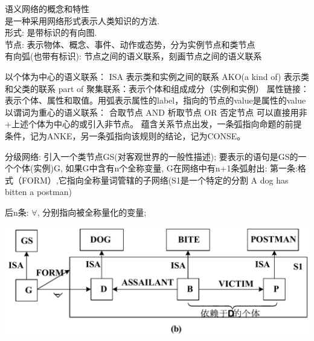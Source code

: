 \documentclass[twocolumn,zihao=5,linespread=1,heading=false,autoindent=0pt]{ctexart}
\theoremstyle{exampstyle} \newtheorem{definition}{定义}[section]
\theoremstyle{exampstyle} \newtheorem{example}{例}[section]
\theoremstyle{exampstyle} \newtheorem{theorem}{定理}[section]
\theoremstyle{exampstyle} \newtheorem{lemma}{引理}[section]
\theoremstyle{exampstyle} \newtheorem{myproof}{证明}[section]
\begin{document}
语义网络的概念和特性\\
是一种采用网络形式表示人类知识的方法.\\
形式: 是带标识的有向图.\\
  节点: 表示物体、概念、事件、动作或态势，分为实例节点和类节点\\
  有向弧(也带有标识): 节点之间的语义联系，刻画节点之间的语义联系
\begin{outline}[citemize]
    \1 以个体为中心的语义联系：
        \2 ISA 表示类和实例之间的联系
        \2 AKO(a kind of) 表示类和父类的联系
        \2 part of 聚集联系：表示个体和组成成分（实例和实例）
        \2 属性链接：表示个体、属性和取值。用弧表示属性的label，指向的节点的value是属性的value
    \1 以谓词为重心的语义联系：
        \1 合取节点 AND
        \1 析取节点 OR
        \1 否定节点 可以直接用非+上述个体为中心的或引入非节点。
        \1 蕴含关系节点出发，一条弧指向命题的前提条件，记为ANKE，另一条弧指向该规则的结论，记为CONSE。
\end{outline}
分级网络: 引入一个类节点GS(对客观世界的一般性描述); 要表示的语句是GS的一个个体(实例)G, 如果G中含有n个全称变量, G在网络中有n+1条弧射出:
第一条:格式（FORM）,它指向全称量词管辖的子网络(S1是一个特定的分割 A dog has bitten a postman)

后n条: $\forall$, 分别指向被全称量化的变量; 

\includegraphics[width=\linewidth]{semantic_network.pdf}
\end{document}
